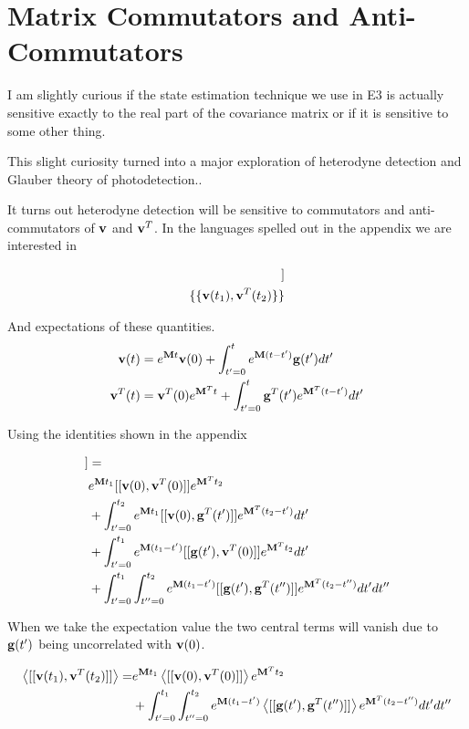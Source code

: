 \documentclass[12pt]{article}
\newcommand{\bv}[1]{\bold{#1}}
\begin{document}
\section{Matrix Commutators and Anti-Commutators}

I am slightly curious if the state estimation technique we use in E3 is actually sensitive exactly to the real part of the covariance matrix or if it is sensitive to some other thing.

This slight curiosity turned into a major exploration of heterodyne detection and  Glauber theory of photodetection..

It turns out heterodyne detection will be sensitive to commutators and anti-commutators of $\bv{v}$ and $\bv{v}^T$. In the languages spelled out in the appendix we are interested in

\begin{align}
[[\bv{v}(t_1),\bv{v}^T(t_2)]]\\
\{\{\bv{v}(t_1),\bv{v}^T(t_2)\}\}
\end{align}

And expectations of these quantities. 
\begin{align}
\bv{v}(t) &= e^{\bv{M}t} \bv{v}(0) + \int_{t'=0}^t e^{\bv{M}(t-t')} \bv{g}(t') dt'\\
\bv{v}^T(t) &=  \bv{v}^T(0)e^{\bv{M}^T t} + \int_{t'=0}^t \bv{g}^T(t')e^{\bv{M}^T (t-t')}  dt'
\end{align}

Using the identities shown in the appendix

\begin{align}
[[\bv{v}(t_1),\bv{v}^T(t_2)]]&= \\
&e^{\bv{M} t_1}[[\bv{v}(0),\bv{v}^T(0)]]e^{\bv{M}^T t_2}\\
&+\int_{t'=0}^{t_2} e^{\bv{M} t_1} [[\bv{v}(0),\bv{g}^T(t')]] e^{\bv{M}^T (t_2-t')} dt'\\
&+\int_{t'=0}^{t_1}e^{\bv{M}(t_1-t')}[[\bv{g}(t'),\bv{v}^T(0)]] e^{\bv{M}^T t_2} dt'\\
&+\int_{t'=0}^{t_1}\int_{t''=0}^{t_2} e^{\bv{M}(t_1-t')}[[\bv{g}(t'),\bv{g}^T(t'')]]e^{\bv{M}^T(t_2-t'')} dt' dt''
\end{align}

When we take the expectation value the two central terms will vanish due to $\bv{g}(t')$ being uncorrelated with $\bv{v}(0)$.

\begin{align}
\Braket{[[\bv{v}(t_1),\bv{v}^T(t_2)]]} =& e^{\bv{M} t_1}\Braket{[[\bv{v}(0),\bv{v}^T(0)]]}e^{\bv{M}^T t_2}\\
&+\int_{t'=0}^{t_1}\int_{t''=0}^{t_2} e^{\bv{M}(t_1-t')}\Braket{[[\bv{g}(t'),\bv{g}^T(t'')]]}e^{\bv{M}^T(t_2-t'')} dt' dt'' 
\end{align}
\end{document}
